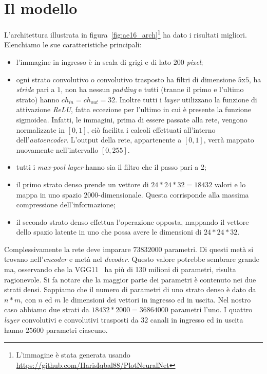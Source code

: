 \section{Il modello}
L'architettura illustrata in figura~\ref{fig:ae16_arch}\footnote{L'immagine è stata generata usando \url{https://github.com/HarisIqbal88/PlotNeuralNet}} ha dato i risultati migliori. %
Elenchiamo le sue caratteristiche principali:
\begin{itemize}
  \item l'immagine in ingresso è in scala di grigi e di lato $200$ \textit{pixel};

  \item ogni strato convolutivo o convolutivo trasposto ha filtri di dimensione $5$x$5$, ha \textit{stride} pari a $1$, non ha nessun \textit{padding} e tutti (tranne il primo e l'ultimo strato) hanno $ch_{in}=ch_{out}=32$.
    Inoltre tutti i \textit{layer} utilizzano la funzione di attivazione \textit{ReLU}, fatta eccezione per l'ultimo in cui è presente la funzione sigmoidea.
    Infatti, le immagini, prima di essere passate alla rete, vengono normalizzate in $[0,1]$, ciò facilita i calcoli effettuati all'interno dell'\textit{autoencoder}.
    L'output della rete, appartenente a $[0,1]$, verrà mappato nuovamente nell'intervallo $[0,255]$.

  \item tutti i \textit{max-pool layer} hanno sia il filtro che il passo pari a 2;

  \item il primo strato denso prende un vettore di $24*24*32=18432$ valori e lo mappa in uno spazio $2000$-dimensionale.
    Questa corrisponde alla massima compressione dell'informazione;

  \item il secondo strato denso effettua l'operazione opposta, mappando il vettore dello spazio latente in uno che possa avere le dimensioni di $24*24*32$.

\end{itemize}
Complessivamente la rete deve imparare  $73 832 000$ parametri.
Di questi metà si trovano nell'\textit{encoder} e metà nel \textit{decoder}.
Questo valore potrebbe sembrare grande ma, osservando che la VGG11~\cite{vgg} ha più di 130 milioni di parametri, risulta ragionevole.
Si fa notare che la maggior parte dei parametri è contenuto nei due strati densi.
Sappiamo che il numero di parametri di uno strato denso è dato da $n * m$, con $n$ ed $m$ le dimensioni dei vettori in ingresso ed in uscita.
Nel nostro caso abbiamo due strati da $18432 * 2000 = 36 864 000$ parametri l'uno.
I quattro \textit{layer} convolutivi e convolutivi trasposti da 32 canali in ingresso ed in uscita hanno $25600$ parametri ciascuno.

